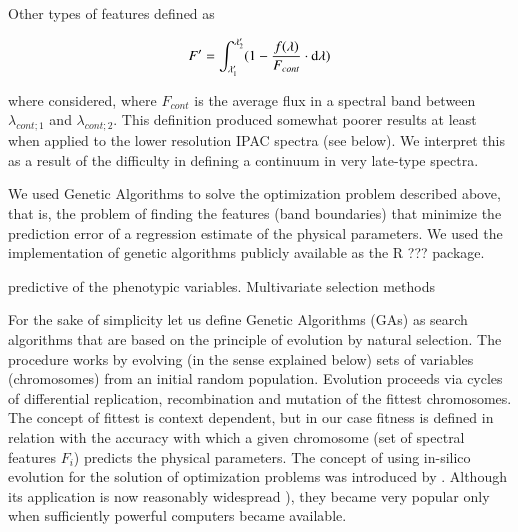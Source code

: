 {Other types of features defined as

\begin{equation}\label{eq:feature2}
  F' = \int_{\lambda'_{1}}^{\lambda'_{2}} (1-\frac{f(\lambda)}{F_{cont}} \cdot {\rm d}{\lambda})
\end{equation}

where considered, where $F_{cont}$ is the average flux in a spectral
band between $\lambda_{cont;1}$ and $\lambda_{cont;2}$. This
definition produced somewhat poorer results at least when applied to
the lower resolution IPAC spectra (see below). We interpret this as a
result of the difficulty in defining a continuum in very late-type
spectra. 

We used Genetic Algorithms to solve the optimization problem described
above, that is, the problem of finding the features (band boundaries)
that minimize the prediction error of a regression estimate of the
physical parameters. We used the implementation of genetic algorithms
publicly available as the R \citep{R2013} ???  package.

predictive of the phenotypic variables. Multivariate selection methods

For the sake of simplicity let us define Genetic Algorithms (GAs) as
search algorithms that are based on the principle of evolution by
natural selection. The procedure works by evolving (in the sense
explained below) sets of variables (chromosomes) from an initial
random population. Evolution proceeds via cycles of differential
replication, recombination and mutation of the fittest
chromosomes. The concept of fittest is context dependent, but in our
case fitness is defined in relation with the accuracy with which a
given chromosome (set of spectral features ${F_i}$) predicts the
physical parameters. The concept of using in-silico evolution for the
solution of optimization problems was introduced
by \cite{holland1975adaptation}. Although its application is now
reasonably widespread \citep[see e.g. ]{goldberg1989genetic}), they
became very popular only when sufficiently powerful computers became
available.


}
